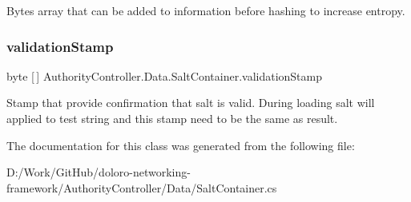 Bytes array that can be added to information before hashing to increase entropy. 

\mbox{\label{class_authority_controller_1_1_data_1_1_salt_container_aba6d56ea2dda89e430cc4049407bba73}} 
\subsubsection{\texorpdfstring{validation\+Stamp}{validationStamp}}
{\footnotesize\ttfamily byte \mbox{[}$\,$\mbox{]} Authority\+Controller.\+Data.\+Salt\+Container.\+validation\+Stamp}



Stamp that provide confirmation that salt is valid. During loading salt will applied to test string and this stamp need to be the same as result. 



The documentation for this class was generated from the following file\+:\begin{DoxyCompactItemize}
\item 
D\+:/\+Work/\+Git\+Hub/doloro-\/networking-\/framework/\+Authority\+Controller/\+Data/Salt\+Container.\+cs\end{DoxyCompactItemize}
